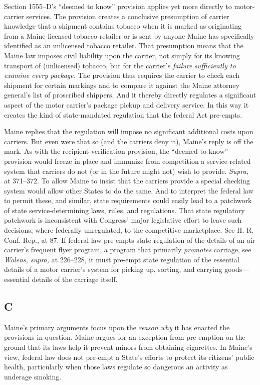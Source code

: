 {{  Section 1555--D's ``deemed to know'' provision applies yet more
directly to motor-carrier services. The provision creates a conclusive
presumption of carrier knowledge that a shipment contains tobacco when
it is marked as originating from a Maine-licensed tobacco retailer or
is sent by anyone Maine has specifically identified as an unlicensed
tobacco retailer. That presumption means that the Maine law imposes
civil liability upon the carrier, not simply for its knowing \newpage 
transport of (unlicensed) tobacco, but for the carrier's \emph{failure}
\emph{sufficiently to examine every package.} The provision thus requires
the carrier to check each shipment for certain markings and to compare
it against the Maine attorney general's list of proscribed shippers.
And it thereby directly regulates a significant aspect of the motor
carrier's package pickup and delivery service. In this way it creates
the kind of state-mandated regulation that the federal Act pre-empts.

  Maine replies that the regulation will impose no significant
additional costs upon carriers. But even were that so (and the
carriers deny it), Maine's reply is off the mark. As with the
recipient-verification provision, the ``deemed to know'' provision
would freeze in place and immunize from competition a service-related
system that carriers do not (or in the future might not) wish to
provide. \emph{Supra,} at 371--372. To allow Maine to insist that the
carriers provide a special checking system would allow other States
to do the same. And to interpret the federal law to permit these, and
similar, state requirements could easily lead to a patchwork of state
service-determining laws, rules, and regulations. That state regulatory
patchwork is inconsistent with Congress' major legislative effort to
leave such decisions, where federally unregulated, to the competitive
marketplace. See H. R. Conf. Rep., at 87. If federal law pre-empts
state regulation of the details of an air carrier's frequent flyer
program, a program that primarily \emph{promotes} carriage, see \emph{Wolens,
supra,} at 226--228, it must pre-empt state regulation of the
essential details of a motor carrier's system for picking up, sorting,
and carrying goods---essential details of the carriage itself.

\subsection{C}

  Maine's primary arguments focus upon the \emph{reason why} it has
enacted the provisions in question. Maine argues for an exception from
pre-emption on the ground that its laws help it prevent minors from
obtaining cigarettes. In Maine's \newpage  view, federal law does not
pre-empt a State's efforts to protect its citizens' public health,
particularly when those laws regulate so dangerous an activity as
underage smoking.

}}
